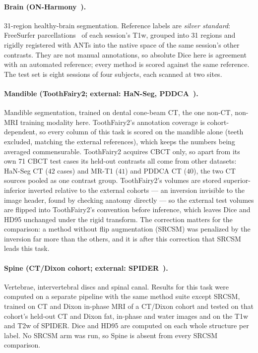 \paragraph{Brain (ON-Harmony~\cite{warrington2025onharmony}).} 31-region healthy-brain
segmentation. Reference labels are \emph{silver standard}: FreeSurfer
parcellations~\cite{fischl2012freesurfer} of each session's T1w, grouped into 31
regions and rigidly registered with ANTs into the native space of the same
session's other contrasts. They are
not manual annotations, so absolute Dice here is agreement with an automated
reference; every method is scored against the same reference. The test set is
eight sessions of four subjects, each scanned at two sites.

\paragraph{Mandible (ToothFairy2; external: HaN-Seg, PDDCA~\cite{bolelli2025toothfairy2,podobnik2023hanseg,raudaschl2017pddca}).}
Mandible segmentation, trained on dental cone-beam CT, the one non-CT, non-MRI
training modality here. ToothFairy2's annotation coverage is
cohort-dependent, so every column of this task is scored on the mandible alone
(teeth excluded, matching the external references), which keeps the numbers
being averaged commensurable. ToothFairy2 acquires CBCT only, so apart from its
own 71 CBCT test cases its held-out contrasts all come from other datasets:
HaN-Seg CT ($42$ cases) and MR-T1 ($41$) and PDDCA CT ($40$), the two CT sources
pooled as one contrast group. ToothFairy2's volumes
are stored superior-inferior inverted relative to the external cohorts --- an
inversion invisible to the image header, found by checking anatomy directly ---
so the external test volumes are flipped into ToothFairy2's convention before
inference, which leaves Dice and HD95 unchanged under the rigid transform. The
correction matters for the comparison: a method without flip augmentation
(SRCSM) was penalized by the inversion far more than the others, and it is
after this correction that SRCSM leads this task.

\paragraph{Spine (CT/Dixon cohort; external: SPIDER~\cite{vandergraaf2024spider}).} Vertebrae, intervertebral
discs and spinal canal. Results for this task were computed on a separate pipeline with the same
method suite except SRCSM, trained on CT
and Dixon in-phase MRI of a CT/Dixon cohort and tested on that cohort's held-out
CT and Dixon fat, in-phase and water images and on the T1w and T2w of SPIDER.
Dice and HD95 are computed on each whole structure per label. No SRCSM arm was run, so Spine
is absent from every SRCSM comparison.

